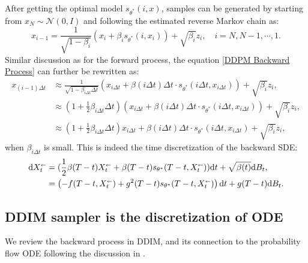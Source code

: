 \documentclass{article}
\theoremstyle{plain}
\theoremstyle{definition}
\theoremstyle{remark}
\newcommand\sla{\scaleobj{0.8}{\leftarrow}}
\begin{document}
After getting the optimal model $s_{\theta^*}(i,x)$, samples can be generated by starting from $x_N \sim \mathcal{N}(0, I)$ and following the estimated reverse Markov chain as:
\begin{equation}
\label{DDPM Backward Process}
x_{i-1}=\frac{1}{\sqrt{1-\beta_i}}\left(x_i+\beta_i s_{\theta^*}\left(i,x_i\right)\right)+\sqrt{\beta_i} z_i, \quad i=N, N-1, \cdots, 1 .
\end{equation}
Similar discussion as for the forward process, the equation \eqref{DDPM Backward Process} can further be rewritten as:
\begin{equation}
\begin{aligned}
x_{(i-1)\Delta t} &\approx \frac{1}{\sqrt{1-\beta_{i\Delta t}\Delta t}}\left(x_{i\Delta t}+\beta (i\Delta t)\Delta t \cdot s_{\theta^*} \left(i\Delta t,x_{i\Delta t}\right)\right)+\sqrt{\beta_i} z_i,\\
&\approx (1+\frac{1}{2}\beta_{i\Delta t}\Delta t)\left(x_{i\Delta t}+\beta (i\Delta t)\Delta t \cdot s_{\theta^*} \left(i\Delta t,x_{i\Delta t}\right)\right)+\sqrt{\beta_i} z_i,\\
&\approx (1+\frac{1}{2}\beta_{i\Delta t}\Delta t)x_{i\Delta t}+\beta (i\Delta t)\Delta t\cdot s_{\theta^*} \left(i\Delta t,x_{i\Delta t}\right)+\sqrt{\beta_i} z_i,
\end{aligned}
\end{equation}
when $\beta_{i\Delta t}$ is small. This is indeed the time discretization of the backward SDE:
\begin{equation}
\begin{aligned}
\mathrm{d} X^{\sla}_t &= (\frac{1}{2} \beta(T-t) X^{\sla}_t + \beta(T-t) s_{\theta^{*}}(T-t, X^{\sla}_t))\mathrm{d}t + \sqrt{\beta(t)} \mathrm{d}B_t,\\
&= \left(-f(T-t,X^{\sla}_t) + g^2(T-t) s_{\theta^{*}}(T-t, X^{\sla}_t)  \right) \mathrm{d}t + g(T-t) \mathrm{d}B_t.
\end{aligned}
\end{equation}

\subsection{DDIM sampler is the discretization of ODE}
\label{app:ddim}
We review the backward process in DDIM, and its connection to the probability flow ODE following the discussion in \cite{Song20SGMbySDE,kingma2021variationalDM,salimans2022progressive,zhang2022fast}.
\end{document}

